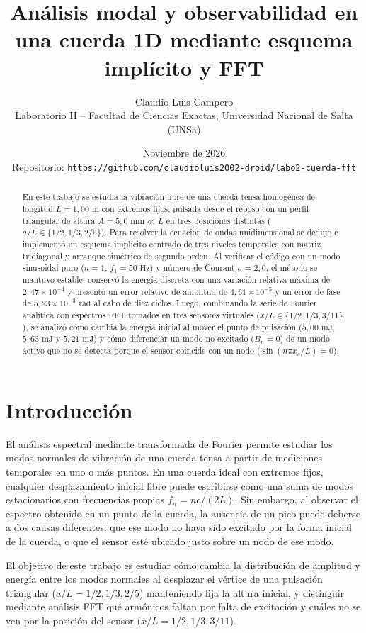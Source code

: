\documentclass[11pt,a4paper]{article}
\title{\textbf{Análisis modal y observabilidad en una cuerda 1D mediante esquema implícito y FFT}}
\author{Claudio Luis Campero \\ \small Laboratorio II -- Facultad de Ciencias Exactas, Universidad Nacional de Salta (UNSa)}
\date{Noviembre de 2026 \\ \small Repositorio: \href{https://github.com/claudioluis2002-droid/labo2-cuerda-fft}{\texttt{https://github.com/claudioluis2002-droid/labo2-cuerda-fft}}}
\begin{document}
\sloppy

\maketitle

\begin{abstract}
En este trabajo se estudia la vibración libre de una cuerda tensa homogénea de longitud $L = 1{,}00\text{ m}$ con extremos fijos, pulsada desde el reposo con un perfil triangular de altura $A = 5{,}0\text{ mm} \ll L$ en tres posiciones distintas ($a/L \in \{1/2, 1/3, 2/5\}$). Para resolver la ecuación de ondas unidimensional se dedujo e implementó un esquema implícito centrado de tres niveles temporales con matriz tridiagonal y arranque simétrico de segundo orden. Al verificar el código con un modo sinusoidal puro ($n=1$, $f_1 = 50\text{ Hz}$) y número de Courant $\sigma = 2{,}0$, el método se mantuvo estable, conservó la energía discreta con una variación relativa máxima de $2{,}47 \times 10^{-4}$ y presentó un error relativo de amplitud de $4{,}61 \times 10^{-5}$ y un error de fase de $5{,}23 \times 10^{-3}\text{ rad}$ al cabo de diez ciclos. Luego, combinando la serie de Fourier analítica con espectros FFT tomados en tres sensores virtuales ($x/L \in \{1/2, 1/3, 3/11\}$), se analizó cómo cambia la energía inicial al mover el punto de pulsación ($5{,}00\text{ mJ}$, $5{,}63\text{ mJ}$ y $5{,}21\text{ mJ}$) y cómo diferenciar un modo no excitado ($B_n = 0$) de un modo activo que no se detecta porque el sensor coincide con un nodo ($\sin(n\pi x_s/L) = 0$).
\end{abstract}

\section{Introducción}

El análisis espectral mediante transformada de Fourier permite estudiar los modos normales de vibración de una cuerda tensa a partir de mediciones temporales en uno o más puntos. En una cuerda ideal con extremos fijos, cualquier desplazamiento inicial libre puede escribirse como una suma de modos estacionarios con frecuencias propias $f_n = n c / (2L)$. Sin embargo, al observar el espectro obtenido en un punto de la cuerda, la ausencia de un pico puede deberse a dos causas diferentes: que ese modo no haya sido excitado por la forma inicial de la cuerda, o que el sensor esté ubicado justo sobre un nodo de ese modo.

El objetivo de este trabajo es estudiar cómo cambia la distribución de amplitud y energía entre los modos normales al desplazar el vértice de una pulsación triangular ($a/L = 1/2, 1/3, 2/5$) manteniendo fija la altura inicial, y distinguir mediante análisis FFT qué armónicos faltan por falta de excitación y cuáles no se ven por la posición del sensor ($x/L = 1/2, 1/3, 3/11$).
\end{document}
